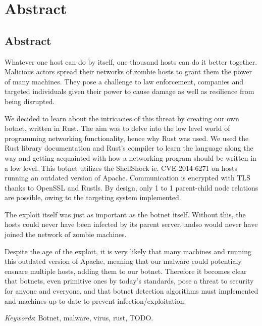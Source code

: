 \documentclass[../main.tex]{subfiles}
\begin{document}
    \newpage

	\chapter*{Abstract}

    \section*{Abstract}

Whatever one host can do by itself, one thousand hosts can do it better together. Malicious actors spread their networks of zombie hosts to grant them the power of many machines.
They pose a challenge to law enforcement, companies and targeted individuals given their power to cause damage as well as resilience from being disrupted.

We decided to learn about the intricacies of this threat by creating our own botnet, written in Rust.
The aim was to delve into the low level world of programming networking functionality, hence why Rust was used. We used the Rust library documentation and Rust's compiler to learn
the language along the way and getting acquainted with how a networking program should be written in a low level.
This botnet utilizes the ShellShock ie. CVE-2014-6271 on hosts running an outdated version of Apache.
Communication is encrypted with TLS thanks to OpenSSL and Rustls. By design, only 1 to 1 parent-child node relations are possible, owing to the targeting system implemented.

The exploit itself was just as important as the botnet itself. Without this, the hosts could never have been infected by its parent server, andso would never have joined the network
of zombie machines.

Despite the age of the exploit, it is very likely that many machines and running this outdated version of Apache, meaning that our malware could potentialy ensnare multiple hosts,
adding them to our botnet. Therefore it becomes clear that botnets, even primitive ones by today's standards, pose a threat to security for anyone and everyone, and that botnet
detection algorithms must implemented and machines up to date to prevent infection/exploitation.



	\qquad \textit{Keywords}: Botnet, malware, virus, rust, TODO.


	\vspace{10pt}
\end{document}
